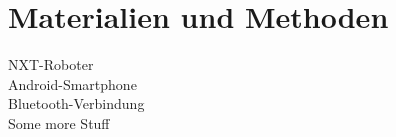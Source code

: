 \chapter{Materialien und Methoden}
\label{cha:Materials}



NXT-Roboter\\

Android-Smartphone\\

Bluetooth-Verbindung\\

Some more Stuff\\

